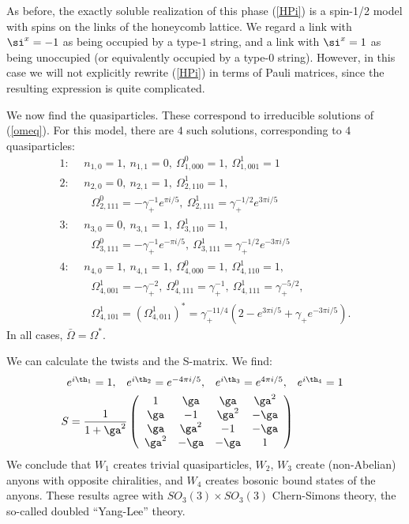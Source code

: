 \documentclass[aps,twocolumn,groupedaddress,showpacs,floatfix]{revtex4}
\begin{document}
As before, the exactly soluble realization of this phase (\ref{HPi}) is a 
spin-1/2 model with spins on the links of the honeycomb lattice. We regard
a link with $\si^x = -1$ as being occupied by a type-$1$ string, and a
link with $\si^x = 1$ as being unoccupied (or equivalently occupied by a
type-$0$ string). However, in this case we will not explicitly rewrite 
(\ref{HPi}) in terms of Pauli matrices, since the resulting expression is quite
complicated.

We now find the quasiparticles. These correspond to irreducible solutions of 
(\ref{omeq}). For this model, there are $4$ such solutions, corresponding to 
$4$ quasiparticles:
\begin{align}
1:\ \ & n_{1,0} = 1, \ n_{1,1} = 0, \ \Omega^{0}_{1,000} = 1, \ 
\Omega^{1}_{1,001} =1 \nonumber \\ 
2:\ \ & n_{2,0} = 0, \ n_{2,1} = 1, \ \Omega^{1}_{2,110} = 1, 
\\
& \ \ \ \Omega^{0}_{2,111} = -\gamma_+^{-1} e^{\pi i/5}, \ 
\Omega^{1}_{2,111} =
\gamma_+^{-1/2}e^{3\pi i/5} 
\nonumber \\
3:\ \ & n_{3,0} = 0, \ n_{3,1} = 1, \ \Omega^{1}_{3,110} = 1, 
\nonumber \\
& \ \ \ \Omega^{0}_{3,111} = -\gamma_+^{-1} e^{-\pi i/5}, \ 
\Omega^{1}_{3,111} = \gamma_+^{-1/2}e^{-3\pi i/5} 
\nonumber \\
4:\ \ & n_{4,0} = 1, \ n_{4,1} = 1, \ \Omega^{0}_{4,000} = 1, \ 
\Omega^{1}_{4,110} = 1, \nonumber \\
& \ \ \ \Omega^{1}_{4,001} = -\gamma_+^{-2}, \ \Omega^{0}_{4,111} = 
\gamma_+^{-1}, \ \Omega^{1}_{4,111} = \gamma_+^{-5/2}, 
\nonumber\\
& \ \ \ \Omega^{1}_{4,101} = (\Omega^{1}_{4,011})^* = 
\gamma_+^{-11/4} (2 - e^{3\pi i/5} +\gamma_+ e^{-3\pi i/5}).
\nonumber 
\end{align}
In all cases, $\bar{\Omega} = \Omega^*$.

We can calculate the twists and the S-matrix. We find:
\begin{align}
&\begin{array}{llll}
e^{i\th_{1}} = 1, & e^{i\th_{2}} = e^{-4\pi i/5}, & 
e^{i\th_{3}}= e^{4\pi i/5}, & e^{i\th_{4}}=1
\end{array} \\
&S = \frac{1}{1+\ga^2}\left ( \begin{array}{cccc}
    1 & \ga & \ga & \ga^2 \\
    \ga & -1 & \ga^2 &-\ga \\
    \ga & \ga^2 & -1 & -\ga \\
    \ga^2 & -\ga & -\ga & 1 \\
        \end{array} \right ) 
\end{align}
We conclude that $W_1$ creates trivial quasiparticles, $W_2$, $W_3$
create (non-Abelian) anyons with opposite chiralities, and $W_4$ creates 
bosonic bound states of the anyons. These results agree with
$SO_{3}(3) \times SO_{3}(3)$ Chern-Simons theory, the so-called 
doubled ``Yang-Lee'' theory. 
\end{document}
